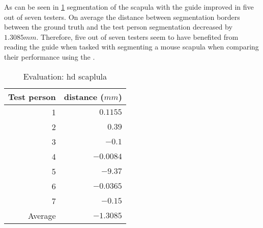 \noindent
As can be seen in \cref{tab:scapula-distance} segmentation of the scapula with the guide improved in five out of seven testers.
On average the distance between segmentation borders between the ground truth and the test person segmentation decreased by $1.3085mm$.
Therefore, five out of seven testers seem to have benefited from reading the guide when tasked with segmenting a mouse scapula when comparing their performance using the .
\begin{table}[ht]
	\begin{center}
		\begin{tabular}{r r}
			\textbf{Test person} & \textbf{distance ($mm$)} \\
			\hline
			1                    & $0.1155$                 \\
			2                    & $0.39$                   \\
			3                    & $-0.1$                   \\
			4                    & $-0.0084$                \\
			5                    & $-9.37$                  \\
			6                    & $-0.0365$                \\
			7                    & $-0.15$                  \\
			\hline
			Average              & $-1.3085$                \\
		\end{tabular}
		\caption{Evaluation: \acrshort{hd} scaplula}\label{tab:scapula-distance}
	\end{center}
\end{table}


